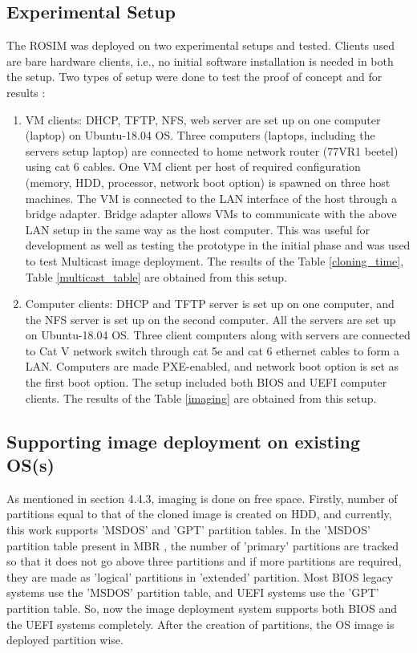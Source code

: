 \documentclass[a4paper,12pt]{article}
\begin{document}
\subsection{ Experimental Setup}
 The ROSIM was deployed on two experimental setups and tested. Clients used are bare hardware clients, i.e., no initial software installation is needed in both the setup.
Two types of setup were done to test the proof of concept and for results :
\begin{enumerate}[label=\roman*.]
    \item  VM clients: DHCP, TFTP, NFS, web server are set up on one computer (laptop) on Ubuntu-18.04 OS. Three computers (laptops, including the servers setup laptop) are connected to home network router (77VR1 beetel) using cat 6 cables.  One VM client per host of required configuration (memory, HDD, processor, network boot option) is spawned on three host machines. The VM is connected to the LAN interface of the host through a bridge adapter. Bridge adapter allows VMs to communicate with the above LAN setup in the same way as the host computer. This was useful for development as well as testing the prototype in the initial phase and was used to test Multicast image deployment. The results of the Table \ref{cloning_time}, Table \ref{multicast_table} are obtained from this setup.
    \item Computer clients: DHCP and TFTP server is set up on one computer, and the NFS server is set up on the second computer. All the servers are set up on Ubuntu-18.04 OS. Three client computers along  with servers are connected to Cat V network switch through cat 5e and cat 6 ethernet cables to form a LAN. Computers are made PXE-enabled, and network boot option is set as the first boot option. The setup included both BIOS and UEFI computer clients. The results of the Table \ref{imaging} are obtained from this setup.

\end{enumerate}
 


\subsection{ Supporting image deployment on existing OS(s)}
As mentioned in section 4.4.3, imaging is done on free space. Firstly, 
number of partitions  equal to that of the cloned image is created on HDD, and currently, this work supports 'MSDOS' and 'GPT' \cite{GPT} partition tables. In the 'MSDOS' partition table present in MBR \cite{MBR}, the number of 'primary' partitions are tracked so that it does not go above three partitions and if more partitions are required, they are made as 'logical' partitions in 'extended' partition. Most BIOS legacy systems use the 'MSDOS' partition table, and UEFI systems use the 'GPT' partition table. So, now the image deployment system supports both BIOS \cite{BIOS} and the UEFI \cite{UEFI} systems completely. After the creation of partitions, the OS image is deployed partition wise.
\end{document}
